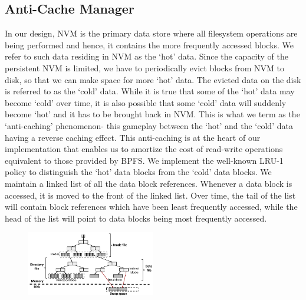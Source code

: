 \subsection{Anti-Cache Manager}
In our design, NVM is the primary data store where all filesystem operations are being performed and hence, it contains the more frequently accessed blocks. We refer to such data residing in NVM as the `hot' data. Since the capacity of the persistent NVM is limited, we have to periodically evict blocks from NVM to disk, so that we can make space for more `hot' data. The evicted data on the disk is referred to as the `cold' data. While it is true that some of the `hot' data may become `cold' over time, it is also possible that some `cold' data will suddenly become `hot' and it has to be brought back in NVM. This is what we term as the `anti-caching' phenomenon- this gameplay between the `hot' and the `cold' data having a reverse caching effect. This anti-caching is at the heart of our implementation that enables us to amortize the cost of read-write operations equivalent to those provided by BPFS. We implement the well-known LRU-1 policy to distinguish the `hot' data blocks from the `cold' data blocks. We maintain a linked list of all the data block references. Whenever a data block is accessed, it is moved to the front of the linked list. Over time, the tail of the list will contain block references which have been least frequently accessed, while the head of the list will point to data blocks being most frequently accessed.

\begin{figure}
\centering
\vspace{-0.2in}
\includegraphics[width=0.5\textwidth]{figs/bpfs2.pdf}
\vspace{-0.2in}
\end{figure}

